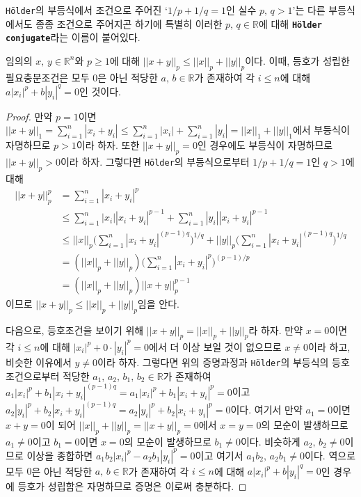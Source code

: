 \texttt{H\"older}의 부등식에서 조건으로 주어진 `$1/p+1/q=1$인 실수 $p,\,q>1$'는 다른 부등식에서도 종종 조건으로 주어지곤 하기에 특별히 이러한 $p,\,q\in\mathbb{R}$에 대해 \textbf{\texttt{H\"older conjugate}}라는 이름이 붙어있다.

\begin{theorem}
    임의의 $x,\,y\in\mathbb{R}^n$와 $p\geq1$에 대해 $||x+y||_p\leq||x||_p+||y||_p$이다. 이때, 등호가 성립한 필요충분조건은 모두 $0$은 아닌 적당한 $a,\,b\in\mathbb{R}$가 존재하여 각 $i\leq n$에 대해 $a|x_i|^p+b|y_i|^q=0$인 것이다.
\end{theorem}

\begin{proof}
    만약 $p=1$이면 $||x+y||_1=\sum_{i=1}^n|x_i+y_i|\leq\sum_{i=1}^n|x_i|+\sum_{i=1}^n|y_i|=||x||_1+||y||_1$에서 부등식이 자명하므로 $p>1$이라 하자. 또한 $||x+y||_p=0$인 경우에도 부등식이 자명하므로 $||x+y||_p>0$이라 하자. 그렇다면 \texttt{H\"older}의 부등식으로부터 $1/p+1/q=1$인 $q>1$에 대해
    \begin{align*}
        ||x+y||_p^p&=\sum_{i=1}^n|x_i+y_i|^p\\
        &\leq\sum_{i=1}^n|x_i||x_i+y_i|^{p-1}+\sum_{i=1}^n|y_i||x_i+y_i|^{p-1}\\
        &\leq||x||_p\bigg(\sum_{i=1}^n|x_i+y_i|^{(p-1)q}\bigg)^{1/q}+||y||_p\bigg(\sum_{i=1}^n|x_i+y_i|^{(p-1)q}\bigg)^{1/q}\\
        &=(||x||_p+||y||_p)\bigg(\sum_{i=1}^n|x_i+y_i|^p\bigg)^{(p-1)/p}\\
        &=(||x||_p+||y||_p)||x+y||_p^{p-1}
    \end{align*}
    이므로 $||x+y||_p\leq||x||_p+||y||_p$임을 안다.

    다음으로, 등호조건을 보이기 위해 $||x+y||_p=||x||_p+||y||_p$라 하자. 만약 $x=0$이면 각 $i\leq n$에 대해 $|x_i|^p+0\cdot|y_i|^p=0$에서 더 이상 보일 것이 없으므로 $x\ne0$이라 하고, 비슷한 이유에서 $y\ne0$이라 하자. 그렇다면 위의 증명과정과 \texttt{H\"older}의 부등식의 등호조건으로부터 적당한 $a_1,\,a_2,\,b_1,\,b_2\in\mathbb{R}$가 존재하여 $a_1|x_i|^p+b_1|x_i+y_i|^{(p-1)q}=a_1|x_i|^p+b_1|x_i+y_i|^p=0$이고 $a_2|y_i|^p+b_2|x_i+y_i|^{(p-1)q}=a_2|y_i|^p+b_2|x_i+y_i|^p=0$이다. 여기서 만약 $a_1=0$이면 $x+y=0$이 되어 $||x||_p+||y||_p=||x+y||_p=0$에서 $x=y=0$의 모순이 발생하므로 $a_1\ne0$이고 $b_1=0$이면 $x=0$의 모순이 발생하므로 $b_1\ne0$이다. 비슷하게 $a_2,\,b_2\ne0$이므로 이상을 종합하면 $a_1b_2|x_i|^p-a_2b_1|y_i|^p=0$이고 여기서 $a_1b_2,\,a_2b_1\ne0$이다. 역으로 모두 $0$은 아닌 적당한 $a,\,b\in\mathbb{R}$가 존재하여 각 $i\leq n$에 대해 $a|x_i|^p+b|y_i|^q=0$인 경우에 등호가 성립함은 자명하므로 증명은 이로써 충분하다.
\end{proof}

